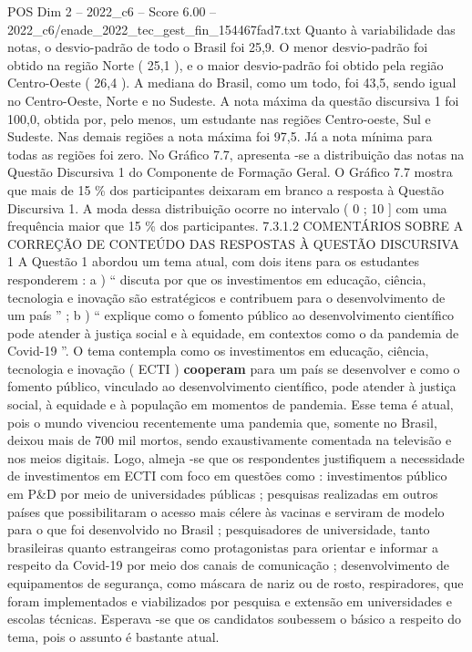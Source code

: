 \begin{textsample}{POS Dim 2 – 2022\_c6 – Score 6.00 – 2022\_c6/enade\_2022\_tec\_gest\_fin\_154467fad7.txt}
Quanto à variabilidade das notas, o desvio-padrão de todo o Brasil foi 25,9.
O menor desvio-padrão foi obtido na região Norte ( 25,1 ), e o maior desvio-padrão foi obtido pela região Centro-Oeste ( 26,4 ).
A mediana do Brasil, como um todo, foi 43,5, sendo igual no Centro-Oeste, Norte e no Sudeste.
A nota máxima da questão discursiva 1 foi 100,0, obtida por, pelo menos, um estudante nas regiões Centro-oeste, Sul e Sudeste.
Nas demais regiões a nota máxima foi 97,5.
Já a nota mínima para todas as regiões foi zero.
No Gráfico 7.7, apresenta -se a distribuição das notas na Questão Discursiva 1 do Componente de Formação Geral.
O Gráfico 7.7 mostra que mais de 15 \% dos participantes deixaram em branco a resposta à Questão Discursiva 1.
A moda dessa distribuição ocorre no intervalo ( 0 ; 10 ] com uma frequência maior que 15 \% dos participantes. 7.3.1.2 COMENTÁRIOS SOBRE A CORREÇÃO DE CONTEÚDO DAS RESPOSTAS À QUESTÃO DISCURSIVA 1 A Questão 1 abordou um tema atual, com dois itens para os estudantes responderem : a ) “ discuta por que os investimentos em educação, ciência, tecnologia e inovação são estratégicos e contribuem para o desenvolvimento de um país ” ; b ) “ explique como o fomento público ao desenvolvimento científico pode atender à justiça social e à equidade, em contextos como o da pandemia de Covid-19 ”.
O tema contempla como os investimentos em educação, ciência, tecnologia e inovação ( ECTI ) \textbf{cooperam} para um país se desenvolver e como o fomento público, vinculado ao desenvolvimento científico, pode atender à justiça social, à equidade e à população em momentos de pandemia.
Esse tema é atual, pois o mundo vivenciou recentemente uma pandemia que, somente no Brasil, deixou mais de 700 mil mortos, sendo exaustivamente comentada na televisão e nos meios digitais.
Logo, almeja -se que os respondentes justifiquem a necessidade de investimentos em ECTI com foco em questões como : investimentos público em P\&D por meio de universidades públicas ; pesquisas realizadas em outros países que possibilitaram o acesso mais célere às vacinas e serviram de modelo para o que foi desenvolvido no Brasil ; pesquisadores de universidade, tanto brasileiras quanto estrangeiras como protagonistas para orientar e informar a respeito da Covid-19 por meio dos canais de comunicação ; desenvolvimento de equipamentos de segurança, como máscara de nariz ou de rosto, respiradores, que foram implementados e viabilizados por pesquisa e extensão em universidades e escolas técnicas.
Esperava -se que os candidatos soubessem o básico a respeito do tema, pois o assunto é bastante atual.

\end{textsample}
